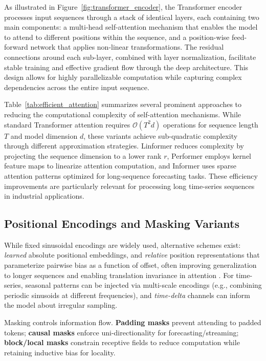 As illustrated in Figure~\ref{fig:transformer_encoder}, the Transformer encoder processes input sequences through a stack of identical layers, each containing two main components: a multi-head self-attention mechanism that enables the model to attend to different positions within the sequence, and a position-wise feed-forward network that applies non-linear transformations. The residual connections around each sub-layer, combined with layer normalization, facilitate stable training and effective gradient flow through the deep architecture. This design allows for highly parallelizable computation while capturing complex dependencies across the entire input sequence.



Table~\ref{tab:efficient_attention} summarizes several prominent approaches to reducing the computational complexity of self-attention mechanisms. While standard Transformer attention requires $\mathcal{O}(T^2 d)$ operations for sequence length $T$ and model dimension $d$, these variants achieve sub-quadratic complexity through different approximation strategies. Linformer reduces complexity by projecting the sequence dimension to a lower rank $r$, Performer employs kernel feature maps to linearize attention computation, and Informer uses sparse attention patterns optimized for long-sequence forecasting tasks. These efficiency improvements are particularly relevant for processing long time-series sequences in industrial applications.

\subsection{Positional Encodings and Masking Variants}
While fixed sinusoidal encodings are widely used, alternative schemes exist: \emph{learned} absolute positional embeddings, and \emph{relative} position representations that parameterize pairwise bias as a function of offset, often improving generalization to longer sequences and enabling translation invariance in attention \citep{shaw2018self}. For time-series, seasonal patterns can be injected via multi-scale encodings (e.g., combining periodic sinusoids at different frequencies), and \emph{time-delta} channels can inform the model about irregular sampling.\par
Masking controls information flow. \textbf{Padding masks} prevent attending to padded tokens; \textbf{causal masks} enforce uni-directionality for forecasting/streaming; \textbf{block/local masks} constrain receptive fields to reduce computation while retaining inductive bias for locality.

